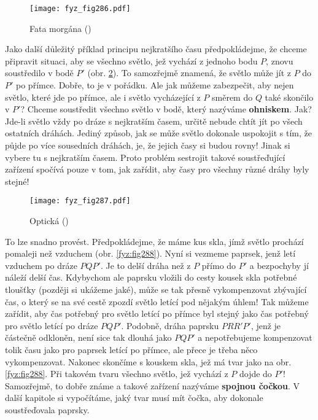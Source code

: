     \begin{figure}[ht!] %
      \centering
      \texttt{[image: fyz\_fig286.pdf]}
      \caption{Fata morgána
               (\cite[s.~351]{Feynman01})}
      \label{fyz:fig286}
    \end{figure}

    Jako další důležitý příklad principu nejkratšího času předpokládejme, že chceme připravit 
    situaci, aby se všechno světlo, jež vychází z jednoho bodu \(P\), znovu soustředilo v bodě 
    \(P'\) (obr. \ref{fyz:fig287}). To samozřejmě znamená, že světlo může jít z \(P\) do \(P'\) po 
    přímce. Dobře, to je v pořádku. Ale jak můžeme zabezpečit, aby nejen světlo, které jde po 
    přímce, ale i světlo vycházející z \(P\) směrem do \(Q\) také skončilo v \(P'\)? Chceme 
    soustředit všechno světlo v bodě, který nazýváme \textbf{ohniskem}. Jak? Jde-li světlo vždy po 
    dráze s nejkratším časem, určitě nebude chtít jít po všech ostatních dráhách. Jediný způsob, 
    jak se může světlo dokonale uspokojit s tím, že půjde po více sousedních dráhách, je, že jejich 
    časy si budou rovny! Jinak si vybere tu s nejkratším časem. Proto problém sestrojit takové 
    soustřeďující zařízení spočívá pouze v tom, jak zařídit, aby časy pro všechny různé dráhy byly 
    stejné!
    
    \begin{figure}[ht!] %
      \centering
      \texttt{[image: fyz\_fig287.pdf]}
      \caption{Optická 
               (\cite[s.~351]{Feynman01})}
      \label{fyz:fig287}
    \end{figure}

    To lze snadno provést. Předpokládejme, že máme kus skla, jímž světlo prochází pomaleji než 
    vzduchem (obr. \ref{fyz:fig288}). Nyní si vezmeme paprsek, jenž letí vzduchem po dráze 
    \(PQP'\). Je to delší dráha než z \(P\) přímo do \(P'\) a bezpochyby jí náleží delší čas. 
    Kdybychom ale paprsku vložili do cesty kousek skla potřebné tloušťky (později si ukážeme jaké), 
    může se tak přesně vykompenzovat zbývající čas, o který se na své cestě zpozdí světlo letící 
    pod nějakým úhlem! Tak můžeme zařídit, aby čas potřebný pro světlo letící po přímce byl stejný 
    jako čas potřebný pro světlo letící po dráze \(PQP'\). Podobně, dráha paprsku \(PRR'P'\), jenž 
    je částečně odkloněn, není sice tak dlouhá jako \(PQP'\) a nepotřebujeme kompenzovat tolik času 
    jako pro paprsek letící po přímce, ale přece je třeba něco vykompenzovat. Nakonec skončíme s 
    kouskem skla, jež má tvar jako na obr. \ref{fyz:fig288}. Při takovém tvaru všechno světlo, jež 
    vychází z \(P\) dojde do \(P'\)! Samozřejmě, to dobře známe a takové zařízení nazýváme 
    \textbf{spojnou čočkou}. V další kapitole si vypočítáme, jaký tvar musí mít čočka, aby dokonale 
    soustřeďovala paprsky.

